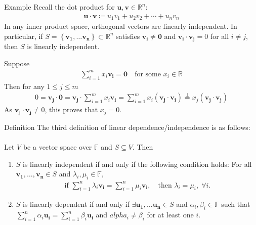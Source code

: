 \documentclass{report}
\renewcommand{\vec}{\mathbf}
\begin{document}
\begin{enumerate}
		\begin{question}{Example}
			Recall the dot product for $\vec{u}, \vec{v} \in \mathbb{R}^n$:
				\begin{align*}
					\vec{u} \cdot \vec{v} \coloneq u_1 v_1 + u_2 v_2 + \cdots + u_n v_n
				\end{align*}
				In any inner product space, orthogonal vectors are linearly independent. In particular, if $S = \left\{\vec{v_1}, \dots \vec{v_n}\right\} \subset \mathbb{R}^n$ satisfies $\vec{v_i} \neq \vec{0}$ and $\vec{v_i} \cdot \vec{v_j} = 0$ for all $i \neq j$, then $S$ is linearly independent. 

			Suppose
				\begin{align*}
					\sum_{i=1}^m x_i \vec{v_i} = \vec{0} \quad \text{for some } x_i \in \mathbb{R}
				\end{align*}
			Then for any $1 \leq j \leq m$
				\begin{align*}
					0 = \vec{v_j} \cdot \vec{0} = \vec{v_j} \cdot \sum_{i=1}^m x_i \vec{v_i} = \sum_{i=1}^m x_i(\vec{v_j} \cdot \vec{v_i}) \stackrel{\perp}{=} x_j (\vec{v_j} \cdot \vec{v_j})
				\end{align*}
				As $\vec{v_j} \cdot \vec{v_j} \neq 0$, this proves that $x_j = 0$.

		\end{question}
		\begin{question}{Definition}
			The third definition of linear dependence/independence is as follows:
			\\ \\
			Let $V$ be a vector space over $\mathbb{F}$ and $S \subseteq V$. Then
			\begin{enumerate}
				\item $S$ is linearly independent if and only if the following condition holds:
					For all $\vec{v_1}, \dots, \vec{v_n} \in S$ and $\lambda_i, \mu_i \in \mathbb{F}$,
					\begin{align*}
						\text{if } \sum_{i=1}^{n} \lambda_i \vec{v_i} = \sum_{i=1}^{n} \mu_i \vec{v_i}, \quad \text{then } \lambda_i = \mu_i, \; \forall i.
					\end{align*}
				\item $S$ is linearly dependent if and only if $\exists \vec{u_1}, \dots \vec{u_n} \in S$ and $\alpha_i, \beta_i \in \mathbb{F}$ such that $\sum_{i=1}^{n} \alpha_i \vec{u_i} = \sum_{i=1}^{n} \beta_i \vec{u_i}$ and $alpha_i \neq \beta_i$ for at least one $i$.
			\end{enumerate}
		\end{question}


\end{enumerate}
\end{document}
